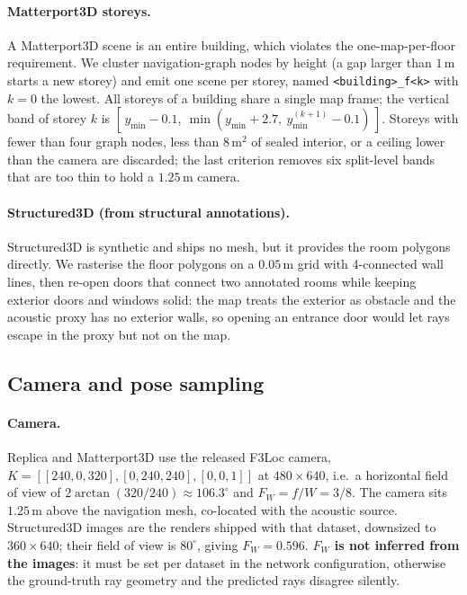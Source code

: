 \paragraph{Matterport3D storeys.}
A Matterport3D scene is an entire building, which violates the one-map-per-floor
requirement. We cluster navigation-graph nodes by height (a gap larger than
$1\,\mathrm{m}$ starts a new storey) and emit one scene per storey, named
\texttt{<building>\_f<k>} with $k=0$ the lowest. All storeys of a building share a
single map frame; the vertical band of storey $k$ is
$[\,y_{\min}-0.1,\ \min(y_{\min}+2.7,\ y^{(k+1)}_{\min}-0.1)\,]$. Storeys with
fewer than four graph nodes, less than $8\,\mathrm{m}^2$ of sealed interior, or a
ceiling lower than the camera are discarded; the last criterion removes six
split-level bands that are too thin to hold a $1.25\,\mathrm{m}$ camera.

\paragraph{Structured3D (from structural annotations).}
Structured3D is synthetic and ships no mesh, but it provides the room polygons
directly. We rasterise the floor polygons on a $0.05\,\mathrm{m}$ grid with
4-connected wall lines, then re-open doors that connect two annotated rooms while
keeping exterior doors and windows solid: the map treats the exterior as obstacle
and the acoustic proxy has no exterior walls, so opening an entrance door would let
rays escape in the proxy but not on the map.

\subsection{Camera and pose sampling}
\label{sec:supp-poses}

\paragraph{Camera.}
Replica and Matterport3D use the released F3Loc camera,
$K = [[240,0,320],[0,240,240],[0,0,1]]$ at $480{\times}640$, i.e.\ a horizontal
field of view of $2\arctan(320/240) \approx 106.3^\circ$ and $F_W = f/W = 3/8$. The
camera sits $1.25\,\mathrm{m}$ above the navigation mesh, co-located with the
acoustic source. Structured3D images are the renders shipped with that dataset,
downsized to $360{\times}640$; their field of view is $80^\circ$, giving
$F_W = 0.596$. \textbf{$F_W$ is not inferred from the images}: it must be set per
dataset in the network configuration, otherwise the ground-truth ray geometry and
the predicted rays disagree silently.

